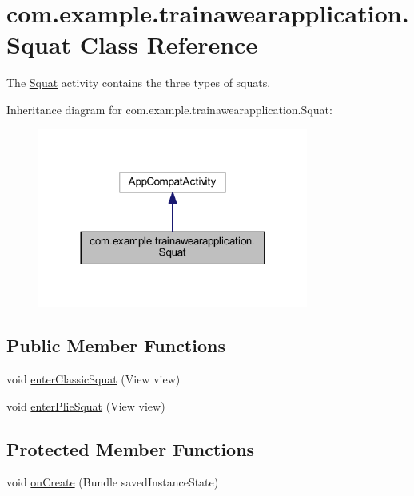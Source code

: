 \hypertarget{classcom_1_1example_1_1trainawearapplication_1_1_squat}{}\section{com.\+example.\+trainawearapplication.\+Squat Class Reference}
\label{classcom_1_1example_1_1trainawearapplication_1_1_squat}


The \mbox{\hyperlink{classcom_1_1example_1_1trainawearapplication_1_1_squat}{Squat}} activity contains the three types of squats.  




Inheritance diagram for com.\+example.\+trainawearapplication.\+Squat\+:
\nopagebreak
\begin{figure}[H]
\begin{center}
\leavevmode
\includegraphics[width=252pt]{classcom_1_1example_1_1trainawearapplication_1_1_squat__inherit__graph}
\end{center}
\end{figure}
\subsection*{Public Member Functions}
\begin{DoxyCompactItemize}
\item 
void \mbox{\hyperlink{classcom_1_1example_1_1trainawearapplication_1_1_squat_aefefdea9b19687975d42841285ae8529}{enter\+Classic\+Squat}} (View view)
\item 
void \mbox{\hyperlink{classcom_1_1example_1_1trainawearapplication_1_1_squat_aa6869623862d4279d1a47e89b34cafb4}{enter\+Plie\+Squat}} (View view)
\end{DoxyCompactItemize}
\subsection*{Protected Member Functions}
\begin{DoxyCompactItemize}
\item 
void \mbox{\hyperlink{classcom_1_1example_1_1trainawearapplication_1_1_squat_a2ee401e1a295432f8196e77dcca9df5f}{on\+Create}} (Bundle saved\+Instance\+State)
\end{DoxyCompactItemize}


